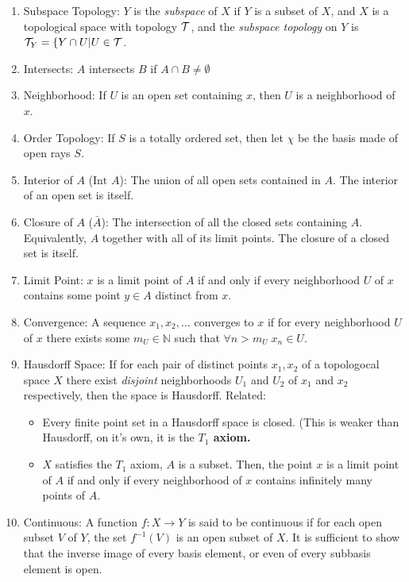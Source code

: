 \documentclass[12pt,letterpaper]{article}
\begin{document}
\begin{enumerate}
  \item \label{dfn:subspace} Subspace Topology: $Y$ is the \emph{subspace} of $X$ if $Y$ is a subset of $X$, and $X$ is a topological space with topology $\mathcal{T}$, and the \emph{subspace topology} on $Y$ is $\mathcal{T}_Y=\{Y\cap U | U\in \mathcal{T}$.
  \item \label{dfn:intersects} Intersects: $A$ intersects $B$ if $A \cap B \neq \emptyset$
  \item \label{dfn:neighborhood} Neighborhood: If $U$ is an open set containing $x$, then $U$ is a neighborhood of $x$.
  \item \label{dfn:orderTopology} Order Topology: If $S$ is a totally ordered set, then let $\chi$ be the basis made of open rays $S$.
  \item \label{dfn:interior} Interior of $A$ ($\text{Int }A$): The union of all open sets contained in $A$. The interior of an open set is itself.
  \item \label{dfn:closure} Closure of $A$ ($\bar{A}$): The intersection of all the closed sets containing $A$. Equivalently, $A$ together with all of its limit points. The closure of a closed set is itself.
  \item \label{dfn:limitPoint} Limit Point: $x$ is a limit point of $A$ if and only if every neighborhood $U$ of $x$ contains some point $y\in A$ distinct from $x$.
  \item \label{dfn:converge} Convergence: A sequence $x_1, x_2, ...$ converges to $x$ if for every neighborhood $U$ of $x$ there exists some $m_U\in\mathbb{N}$ such that $\forall n>m_U\; x_n\in U$.
  \item \label{dfn:Hausdorff} Hausdorff Space: If for each pair of distinct points $x_1,x_2$ of a topologocal space $X$ there exist \emph{disjoint} neighborhoods $U_1$ and $U_2$ of $x_1$ and $x_2$ respectively, then the space is Hausdorff.
  Related:
  \begin{itemize}
    \item \label{thm:FinitePointHausdorff} Every finite point set in a Hausdorff space is closed. (This is weaker than Hausdorff, on it's own, it is the \textbf{$T_1$ axiom.}
    \item \label{thm:LimitPointT1} $X$ satisfies the $T_1$ axiom, $A$ is a subset. Then, the point $x$ is a limit point of $A$ if and only if every neighborhood of $x$ contains infinitely many points of $A$.
  \end{itemize}
  \item \label{dfn:continuous} Continuous: A function $f: X\rightarrow Y$ is said to be continuous if for each open subset $V$ of $Y$, the set $f^{-1}(V)$ is an open subset of $X$. It is sufficient to show that the inverse image of every basis element, or even of every subbasis element is open.

\end{enumerate}
\end{document}
